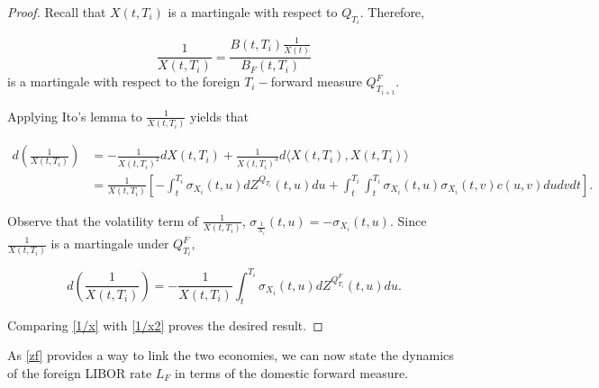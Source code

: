 \documentclass[11pt]{article}
\begin{document}
\begin{proof}




Recall that $X(t,T_i)$ is a martingale with respect to $Q_{T_{i}}$. Therefore,

\begin{equation*}
    \frac{1}{X(t,T_i)}=\frac{B(t,T_i)\frac{1}{X(t)}}{B_F(t,T_i)}
\end{equation*}
is a martingale with respect to the foreign $T_i-$forward measure $Q_{T_{i+1}}^F.$


Applying Ito's lemma to $\frac{1}{X(t,T_i)}$ yields that

\begin{equation}\label{1/x}
\begin{split}
    d\left(\frac{1}{X(t,T_i)}\right)&=-\frac{1}{X(t,T_i)^2}dX(t,T_i)+\frac{1}{X(t,T_i)^3}d
    \langle X(t,T_i),X(t,T_i)\rangle\\
    &= \frac{1}{X(t,T_i)}\left[-\int_t^{T_i}\sigma_{X_i}(t,u)dZ^{Q_{T_i}}(t,u)du+\int_{t}^{T_i}\int_{t}^{T_i}\sigma_{X_i}(t,u)\sigma_{X_i}(t,v)c(u,v)dudvdt\right ].
\end{split}
\end{equation}

Observe that the volatility term of $\frac{1}{X(t,T_i)}$, $\sigma_{\frac{1}{X_i}}(t,u)=-\sigma_{X_i}(t,u).$ Since $\frac{1}{X(t,T_i)}$ is a martingale under $Q^F_{T_i},$

\begin{equation}\label{1/x2}
     d\left(\frac{1}{X(t,T_i)}\right)
    = -\frac{1}{X(t,T_i)}\int_t^{T_i}\sigma_{X_i}(t,u)dZ^{Q^F_{T_i}}(t,u)du. 
\end{equation}

Comparing \eqref{1/x} with \eqref{1/x2} proves the desired result.


\end{proof}



As \eqref{zf} provides a way to link the two economies, we can now state the dynamics of the foreign LIBOR rate $L_F$ in terms of the domestic forward measure. 
\end{document}
